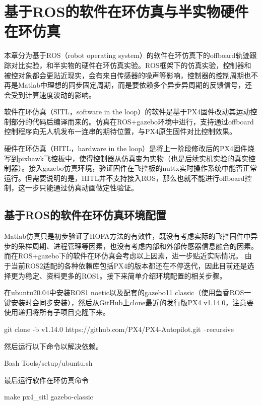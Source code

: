 \chapter{基于ROS的软件在环仿真与半实物硬件在环仿真}
本章分为基于ROS（robot operating system）的软件在环仿真下的offboard轨迹跟踪对比实验，和半实物的硬件在环仿真实验。ROS框架下的仿真实验，控制器和被控对象都会更贴近现实，会有来自传感器的噪声等影响，控制器的控制周期也不再是Matlab中理想的同步固定周期，而是要依赖多个异步异周期的反馈信号，还会受到计算速度波动的影响。

软件在环仿真（SITL，software in the loop）的软件是基于PX4固件改动其运动控制部分的代码后编译而来的。仿真在ROS+gazebo环境中进行，支持通过offboard控制程序向无人机发布一连串的期待位置，与PX4原生固件对比控制效果。

硬件在环仿真（HITL，hardware in the loop）是将上一阶段修改后的PX4固件烧写到pixhawk飞控板中，使得控制器从仿真变为实物（也是后续实机实验的真实控制器）。接入gazebo仿真环境，验证固件在飞控板的nuttx实时操作系统中能否正常运行。但需要说明的是，HITL并不支持接入ROS，那么也就不能进行offboard控制，这一步只能通过仿真动画做定性验证。

\section{基于ROS的软件在环仿真环境配置}
Matlab仿真只是初步验证了HOFA方法的有效性，既没有考虑实际的飞控固件中异步的采样周期、进程管理等因素，也没有考虑内部和外部传感器信息融合的因素。而在ROS+gazebo下的软件在环仿真会考虑以上因素，进一步贴近实际情况。
由于当前ROS2适配的各种依赖库包括PX4的版本都还在不停迭代，因此目前还是选择更为稳定、资料更多的ROS1。接下来简单介绍环境配置的相关步骤。

在ubuntu20.04中安装ROS1 noetic以及配套的gazebo11 classic（使用鱼香ROS一键安装\cite{fishros}时会同步安装），然后从GitHub上clone最近的发行版PX4 v1.14.0，注意要使用递归将所有子项目克隆下来。
\begin{codeblock}[language=C]
  git clone -b v1.14.0 https://github.com/PX4/PX4-Autopilot.git --recursive
\end{codeblock}
然后运行以下命令以解决依赖。
\begin{codeblock}[language=C]
  Bash Tools/setup/ubuntu.sh
\end{codeblock}
最后运行软件在环仿真命令
\begin{codeblock}[language=C]
  make px4_sitl gazebo-classic
\end{codeblock}


